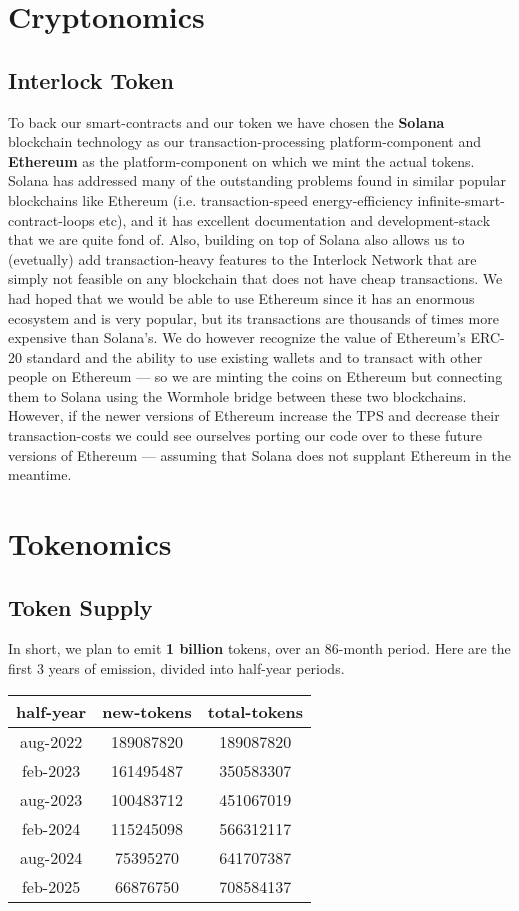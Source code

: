 \documentclass[a4paper]{article}
\begin{document}
\section{Cryptonomics}

\subsection{Interlock Token}

To back our smart-contracts and our token we have chosen the \textbf{
Solana} blockchain technology as our transaction-processing
platform-component and \textbf{Ethereum} as the platform-component on
which we mint the actual tokens. Solana has addressed many of the
outstanding problems found in similar popular blockchains like Ethereum
(i.e. transaction-speed energy-efficiency infinite-smart-contract-loops
etc), and it has excellent documentation and development-stack that we
are quite fond of. Also, building on top of Solana also allows us to
(evetually) add transaction-heavy features to the Interlock Network that
are simply not feasible on any blockchain that does not have cheap
transactions. We had hoped that we would be able to use Ethereum since
it has an enormous ecosystem and is very popular, but its transactions
are thousands of times more expensive than Solana's. We do however
recognize the value of Ethereum's ERC-20 standard and the ability to use
existing wallets and to transact with other people on Ethereum --- so we
are minting the coins on Ethereum but connecting them to Solana using
the Wormhole bridge between these two blockchains. However, if the newer
versions of Ethereum increase the TPS and decrease their
transaction-costs we could see ourselves porting our code over to these
future versions of Ethereum --- assuming that Solana does not supplant
Ethereum in the meantime.

\section{Tokenomics}

\subsection{Token Supply}

In short, we plan to emit \textbf{1 billion} tokens, over an 86-month
period. Here are the first 3 years of emission, divided into half-year
periods.

\begin{table}
\centering
\begin{tabular}{|c|c|c|}
\hline half-year & new-tokens & total-tokens \\ \hline
aug-2022 & 189087820 & 189087820 \\
feb-2023 & 161495487 & 350583307 \\
aug-2023 & 100483712 & 451067019 \\
feb-2024 & 115245098 & 566312117 \\
aug-2024 & 75395270 & 641707387 \\
feb-2025 & 66876750 & 708584137 \\
\hline
\end{tabular}
\end{table}
\end{document}
